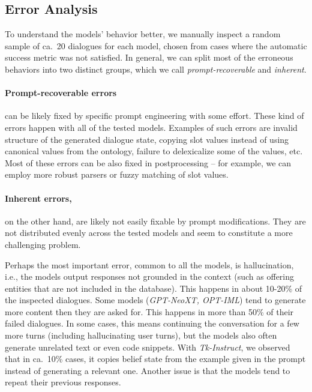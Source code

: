 \subsection{Error Analysis}

To understand the models' behavior better, we manually inspect a random sample of ca.~20 dialogues for each model, chosen from cases where the automatic success metric was not satisfied. 
In general, we can split most of the erroneous behaviors into two distinct groups, which we call \emph{prompt-recoverable} and \emph{inherent}.

\paragraph{Prompt-recoverable errors} can be likely fixed by specific prompt engineering with some effort.
These kind of errors happen with all of the tested models.
Examples of such errors are invalid structure of the generated dialogue state, copying slot values instead of using canonical values from the ontology, failure to delexicalize some of the values, etc.
Most of these errors can be also fixed in postprocessing -- for example, we can employ more robust parsers or fuzzy matching of slot values.

\paragraph{Inherent errors,} on the other hand, are likely not easily fixable by prompt modifications.
They are not distributed evenly across the tested models and seem to constitute a more challenging problem.

Perhaps the most important error, common to all the models, is hallucination, i.e., the models output responses not grounded in the context (such as offering entities that are not included in the database). This happens in about 10-20\% of the inspected dialogues.
Some models (\emph{GPT-NeoXT, OPT-IML}) tend to generate more content then they are asked for.
This happens in more than 50\% of their failed dialogues.
In some cases, this means continuing the conversation for a few more turns (including hallucinating user turns), but the models also often generate unrelated text or even code snippets.
With \emph{Tk-Instruct}, we observed that in ca.~10\% cases, it copies belief state from the example given in the prompt instead of generating a relevant one.
Another issue is that the models tend to repeat their previous responses.

